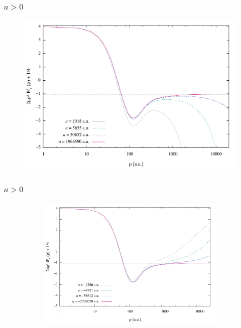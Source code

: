 \documentclass{beamer}
\begin{document}
\begin{frame}
\frametitle{$a >0$}
\begin{figure}
	\includegraphics[width=0.8\linewidth]{finite_positive_a.pdf}
\end{figure}
\end{frame}

\begin{frame}
\frametitle{$a>0$}
\begin{figure}
	\begin{figure}
		\includegraphics[width=0.8\linewidth]{finite_negative_a.pdf}
	\end{figure}
\end{figure}
\end{frame}


\end{document}
